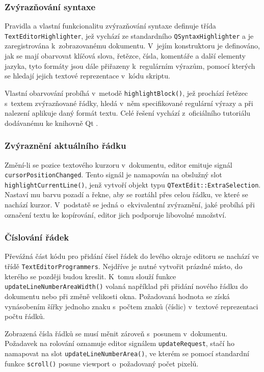 \documentclass[11pt,twoside,a4paper]{book}
\begin{document}
\subsubsection{Zvýrazňování syntaxe}

Pravidla a vlastní funkcionalitu zvýrazňování syntaxe definuje třída \texttt{Text\-E\-di\-tor\-High\-ligh\-ter}, jež vychází ze standardního \texttt{QSyntaxHighlighter} a je zaregistrována k~zobrazovanému dokumentu. V~jejím konstruktoru je definováno, jak se mají obarvovat klíčová slova, řetězce, čísla, komentáře a další elementy jazyka, tyto formáty jsou dále přiřazeny k~regulárním výrazům, pomocí kterých se hledají jejich textové reprezentace v~kódu skriptu.

Vlastní obarvování probíhá v~metodě \texttt{highlightBlock()}, jež prochází řetězec s~textem zvýrazňované řádky, hledá v~něm specifikované regulární výrazy a při nalezení aplikuje daný formát textu. Celé řešení vychází z~oficiálního tutoriálu dodávanému ke knihovně Qt \cite{syntax_highlighter_example}.


\subsubsection{Zvýraznění aktuálního řádku}

Změní-li se pozice textového kurzoru v~dokumentu, editor emituje signál \texttt{cur\-sor\-Po\-si\-ti\-on\-Chan\-ged}. Tento signál je namapován na obslužný slot \texttt{highlightCurrentLine()}, jenž vytvoří objekt typu \texttt{QTextEdit::ExtraSelection}. Nastaví mu barvu pozadí a řekne, aby se roztáhl přes celou řádku, ve které se nachází kurzor. V~podstatě se jedná o~ekvivalentní zvýraznění, jaké probíhá při označení textu ke kopírování, editor jich podporuje libovolné množství.


\subsubsection{Číslování řádek}

Převážná část kódu pro přidání čísel řádek do levého okraje editoru se nachází ve třídě \texttt{TextEditorProgrammers}. Nejdříve je nutné vytvořit prázdné místo, do kterého se později budou kreslit. K~tomu slouží funkce \texttt{updateLineNumberAreaWidth()} volaná například při přidání nového řádku do dokumentu nebo při změně velikosti okna. Požadovaná hodnota se získá vynásobením šířky jednoho znaku s~počtem znaků (číslic) v~textové reprezentaci počtu řádků.

Zobrazená čísla řádků se musí měnit zároveň s~posunem v~dokumentu. Požadavek na rolování oznamuje editor signálem \texttt{updateRequest}, stačí ho namapovat na slot \texttt{up\-da\-te\-Li\-ne\-Num\-ber\-A\-re\-a()}, ve kterém se pomocí standardní funkce \texttt{scroll()} posune viewport o~požadovaný počet pixelů.
\end{document}
